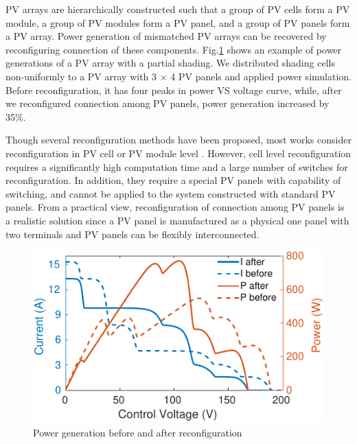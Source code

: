 \documentclass[conference]{pvsctran}
\begin{document}
PV arrays are hierarchically constructed such that a group of PV cells form a PV module, a group of PV modules form a PV panel, and a group of PV panels form a PV array. 
Power generation of mismatched PV arrays can be recovered by reconfiguring connection of these components. 
Fig.\ref{compare} shows an example of power generations of a PV array with a partial shading. 
We distributed shading cells non-uniformly to a PV array with 3 $\times$  4 PV panels and applied power simulation. 
Before reconfiguration, it has four peaks in power VS voltage curve, while, after we reconfigured connection among PV panels, power generation increased by 35\%.

Though several reconfiguration methods have been proposed, most works consider reconfiguration in PV cell or PV module level \cite{nguyen2008adaptive,wang2014architecture,storey2013improved,storey2014optimized,udenze2018reconfiguration}. 
However, cell level reconfiguration requires a significantly high computation time and a large number of switches for reconfiguration. 
In addition, they require a special PV panels with capability of switching, and cannot be applied to the system constructed with standard PV panels. 
From a practical view, reconfiguration of connection among PV panels is a realistic solution since a PV panel is manufactured as a physical one panel with two terminals and PV panels can be flexibly interconnected. 
\begin{figure}[t]
    \centering
    \includegraphics[width=0.8\linewidth]{../fig/compare.png}
    \caption{Power generation before and after reconfiguration}
    \label{compare}
\end{figure}
\end{document}
